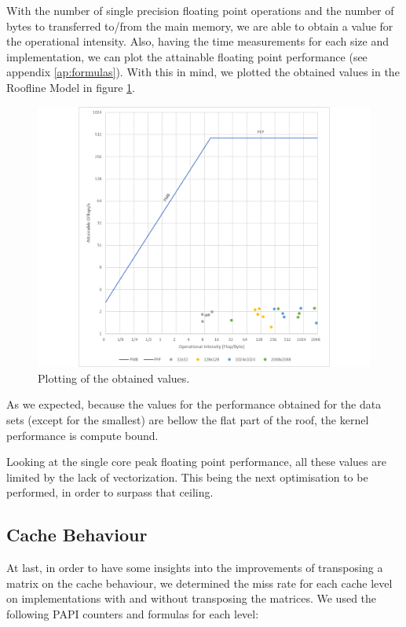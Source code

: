 \documentclass[twoside,twocolumn]{article}
\begin{document}
With the number of single precision floating point operations and the number of bytes to transferred to/from the main memory, we are able to obtain a value for the operational intensity. Also, having the time measurements for each size and implementation, we can plot the attainable floating point performance (see appendix \ref{ap:formulas}). With this in mind, we plotted the obtained values in the Roofline Model in figure \ref{fig:plotroofline}.

\begin{figure}[H]
    \includegraphics[width=\columnwidth]{plot_roofline.png}
    \centering
    \caption{Plotting of the obtained values.}
    \label{fig:plotroofline}
\end{figure}

As we expected, because the values for the performance obtained for the data sets (except for the smallest) are bellow the flat part of the roof, the kernel performance is compute bound.

Looking at the single core peak floating point performance, all these values are limited by the lack of vectorization. This being the next optimisation to be performed, in order to surpass that ceiling.

\subsection{Cache Behaviour}

At last, in order to have some insights into the improvements of transposing a matrix on the cache behaviour, we determined the miss rate for each cache level on implementations with and without transposing the matrices. We used the following PAPI counters and formulas for each level:
\end{document}
